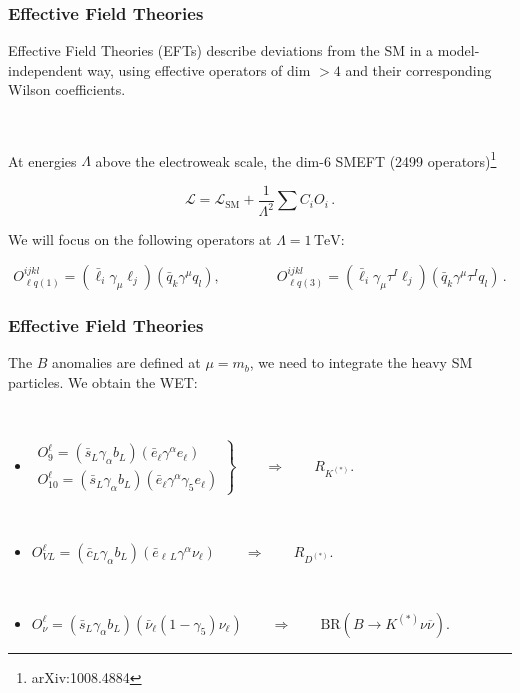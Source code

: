 \documentclass[mathserif, 10pt]{beamer}
\begin{document}
\begin{frame}
    \frametitle{Effective Field Theories}

    Effective Field Theories (EFTs) describe deviations from the SM in a model-independent way, using effective operators of dim $>4$ and their corresponding Wilson coefficients.

    ~

    At energies $\Lambda$ above the electroweak scale, the dim-6 SMEFT (2499 operators)\footnote[1]{arXiv:1008.4884}

    $$\mathcal{L} = \mathcal{L}_\mathrm{SM} + \frac{1}{\Lambda^2}\sum C_i O_i\,.$$

    We will focus on the following operators at $\Lambda = 1\,\mathrm{TeV}$:

    $$O_{\ell q(1)}^{ijkl} = (\bar{\ell}_i \gamma_\mu \ell_j)(\bar{q}_k \gamma^\mu  q_l),\qquad\qquad O_{\ell q(3)}^{ijkl}= (\bar{\ell}_i \gamma_\mu \tau^I \ell_j)(\bar{q}_k \gamma^\mu \tau^I q_l)\,.$$

\end{frame}

\begin{frame}

    \frametitle{Effective Field Theories}
    The $B$ anomalies are defined at $\mu=m_b$, we need to integrate the heavy SM particles. We obtain the WET\@:

    ~

    \begin{itemize}
        \item $\left.\begin{matrix}
                      O_9^\ell = (\bar{s}_L \gamma_\alpha b_L)(\bar{e}_\ell \gamma^\alpha e_\ell) \\
                      O_{10}^\ell = (\bar{s}_L \gamma_\alpha b_L)(\bar{e}_\ell \gamma^\alpha \gamma_5 e_\ell)
                  \end{matrix}\right\} \qquad \Longrightarrow \qquad R_{K^{(*)}}$. %

              ~

        \item $O_{VL}^\ell = (\bar{c}_L \gamma_\alpha b_L)(\bar{e}_{\ell\,L} \gamma^\alpha \nu_\ell) \qquad\Longrightarrow\qquad R_{D^{(*)}}$.

              ~

        \item $O_\nu^\ell = (\bar{s}_L \gamma_\alpha b_L)(\bar{\nu}_\ell (1-\gamma_5) \nu_\ell) \qquad\Longrightarrow \qquad \mathrm{BR}(B\to K^{(*)}\nu\overline{\nu})$.
    \end{itemize}



\end{frame}
\end{document}
